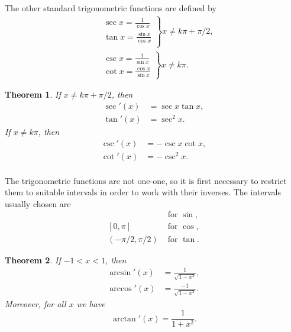 \documentclass{article}
\newtheorem{theorem}{Theorem}
\begin{document}
The other standard trigonometric functions are defined by \begin{align*}
  &\left.\begin{array}{c}
    \sec x = \frac{1}{\cos x} \\
    \tan x = \frac{\sin x}{\cos x} \\
  \end{array}\right\} x \neq k\pi + \pi/2, \\
  &\left.\begin{array}{c}
    \csc x = \frac{1}{\sin x} \\
    \cot x = \frac{\cos x}{\sin x}
  \end{array}\right\} x \neq k\pi.
\end{align*}

\begin{theorem}
  If $x \neq k\pi + \pi/2$, then \begin{align*}
    \sec'(x) &= \sec x \tan x, \\
    \tan'(x) &= \sec^2 x.
  \end{align*} If $x \neq k\pi$, then \begin{align*}
    \csc'(x) &= -\csc x \cot x, \\
    \cot'(x) &= -\csc^2 x. \\
  \end{align*}
\end{theorem}

The trigonometric functions are not one-one, so it is first necessary to
restrict them to suitable intervals in order to work with their inverses. The
intervals usually chosen are \begin{align*}
  [-\pi/2, \pi/2] &\text{ for } \sin, \\
  [0, \pi]        &\text{ for } \cos, \\
  (-\pi/2, \pi/2) &\text{ for } \tan.
\end{align*}

\begin{theorem}
  If $-1 < x < 1$, then \begin{align*}
    \arcsin'(x) &= \frac{1}{\sqrt{1 - x^2}}, \\
    \arccos'(x) &= \frac{-1}{\sqrt{1 - x^2}}.
  \end{align*} Moreover, for all $x$ we have \begin{equation*}
    \arctan'(x) = \frac{1}{1 + x^2}.
  \end{equation*}
\end{theorem}
\end{document}
